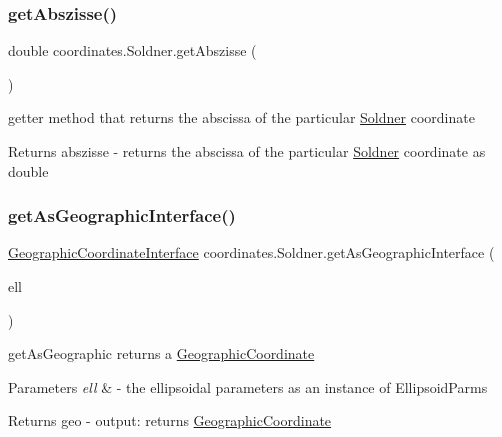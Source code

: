 \subsubsection{\texorpdfstring{get\+Abszisse()}{getAbszisse()}}
{\footnotesize\ttfamily double coordinates.\+Soldner.\+get\+Abszisse (\begin{DoxyParamCaption}{ }\end{DoxyParamCaption})}



getter method that returns the abscissa of the particular \hyperlink{classcoordinates_1_1_soldner}{Soldner} coordinate 

\begin{DoxyReturn}{Returns}
abszisse -\/ returns the abscissa of the particular \hyperlink{classcoordinates_1_1_soldner}{Soldner} coordinate as double 
\end{DoxyReturn}
\mbox{\label{classcoordinates_1_1_soldner_ab87732c40411256ffd5cfba0ad4bd2cc}} 
\subsubsection{\texorpdfstring{get\+As\+Geographic\+Interface()}{getAsGeographicInterface()}}
{\footnotesize\ttfamily \hyperlink{classcoordinates_1_1_geographic_coordinate_interface}{Geographic\+Coordinate\+Interface} coordinates.\+Soldner.\+get\+As\+Geographic\+Interface (\begin{DoxyParamCaption}\item[{\hyperlink{classparams_1_1_ellipsoid_parms}{Ellipsoid\+Parms}}]{ell }\end{DoxyParamCaption})}



get\+As\+Geographic returns a \hyperlink{classcoordinates_1_1_geographic_coordinate}{Geographic\+Coordinate} 


\begin{DoxyParams}{Parameters}
{\em ell} & -\/ the ellipsoidal parameters as an instance of Ellipsoid\+Parms \\
\hline
\end{DoxyParams}
\begin{DoxyReturn}{Returns}
geo -\/ output\+: returns \hyperlink{classcoordinates_1_1_geographic_coordinate}{Geographic\+Coordinate} 
\end{DoxyReturn}
\mbox{\label{classcoordinates_1_1_soldner_a6ab74bfedc2b81db5ec9b40228b5a51c}} 
